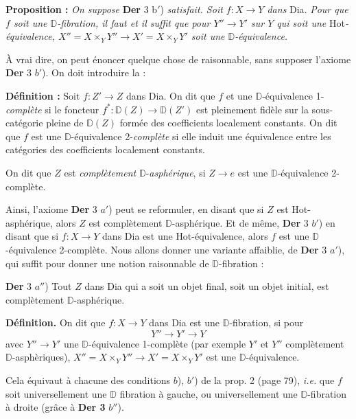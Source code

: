 \documentclass[11pt]{article}
\newcommand{\printedpage}[1]{\marginpar{\footnotesize p.~#1}}
\newcommand{\msp}[1]{\marginpar{\footnotesize [#1]}}
\newcommand{\Hot}{\textsf{Hot}}
\newcommand{\Dia}{\textsf{Dia}}
\newcommand{\DD}{\mathbb{D}}
\begin{document}
\textbf{Proposition :} \textit{On suppose} \textbf{Der} 3 \textup{b}$'$) \textit{satisfait. Soit $f : X \to Y$ dans} \Dia. \textit{Pour que $f$ soit une $\DD$-fibration, il faut et il suffit que pour $Y'' \to Y'$ sur $Y$ qui soit une} \Hot\textit{-équivalence, $X'' = X \times_Y Y'' \to X' = X \times_Y Y'$ soit une $\DD$-équivalence.}

À vrai dire, on peut énoncer quelque chose de raisonnable, sans supposer l’axiome \textbf{Der} 3 $b'$). On doit introduire la :

\textbf{Définition :} Soit $f : Z' \to Z$ dans \Dia. On dit que $f$ et une $\DD$-équivalence 1-\textit{complète} si le foncteur $f^* : \DD(Z) \to \DD(Z')$ est pleinement fidèle sur la sous-catégorie pleine de $\DD(Z)$ formée des coefficients localement constants. On dit que $f$ est une $\DD$-équivalence 2-\textit{complète} si elle induit une équivalence entre les catégories des coefficients localement constants. %

\msp{page 100}
On dit que $Z$ est \textit{complètement} $\DD$-\textit{asphérique}, si $Z \to e$ est une $\DD$-équivalence 2-complète.

\printedpage{61}

Ainsi, l’axiome \textbf{Der} 3 $a'$) peut se reformuler, en disant que si $Z$ est \Hot-asphérique, alors $Z$ est complètement $\DD$-asphérique. Et de même, \textbf{Der} 3 $b'$) en disant que si $f : X \to Y$ dans \Dia{} est une \Hot-équivalence, alors $f$ est une $\DD$-équivalence 2-complète. Nous allons donner une variante affaiblie, de \textbf{Der} 3 $a'$), qui suffit pour donner une notion raisonnable de $\DD$-fibration :

\textbf{Der} 3 $a''$) Tout $Z$ dans \Dia{} qui a soit un objet final, soit un objet initial, est complètement $\DD$-asphérique.

\textbf{Définition.} On dit que $f : X \to Y$ dans \Dia{} est une $\DD$-fibration, si pour
\[
Y'' \longrightarrow Y' \longrightarrow Y
\]
avec $Y'' \to Y'$ une $\DD$-équivalence 1-complète (par exemple $Y'$ et $Y''$ complètement $\DD$-asphèriques), $X'' = X \times_Y Y'' \longrightarrow X' = X \times_Y Y'$ est une $\DD$-équivalence. %

Cela équivaut à chacune des conditions $b$), $b'$) de la prop. 2 (page 79), \textit{i.e.} que $f$ soit universellement une $\DD$ fibration à gauche, ou universellement une $\DD$-fibration à droite (grâce à \textbf{Der 3} $b''$). %
\end{document}
